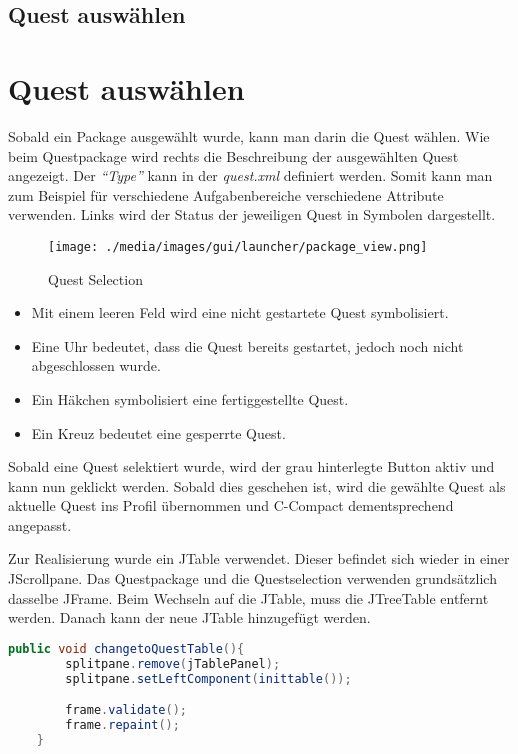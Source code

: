 \iffabian
	\subsection{Quest auswählen}
\else
	\section{Quest auswählen}
\fi

Sobald ein Package ausgewählt wurde, kann man darin die Quest wählen. Wie beim Questpackage wird rechts die Beschreibung der ausgewählten Quest angezeigt. Der \textit{"`Type"'} kann in der \textit{quest.xml} definiert werden. Somit kann man zum Beispiel für verschiedene Aufgabenbereiche verschiedene Attribute verwenden. Links wird der Status der jeweiligen Quest in Symbolen dargestellt.

\begin{figure}[h] 
  \centering
     \texttt{[image: ./media/images/gui/launcher/package\_view.png]}
  \caption{Quest Selection}
  \label{fig:Bild1}
\end{figure}

\begin{itemize}
\item Mit einem leeren Feld wird eine nicht gestartete Quest symbolisiert.
\item Eine Uhr bedeutet, dass die Quest bereits gestartet, jedoch noch nicht abgeschlossen wurde.
\item Ein Häkchen symbolisiert eine fertiggestellte Quest.
\item Ein Kreuz bedeutet eine gesperrte Quest. 
\end{itemize}

Sobald eine Quest selektiert wurde, wird der grau hinterlegte Button aktiv und kann nun geklickt werden. Sobald dies geschehen ist, wird die gewählte Quest als aktuelle Quest ins Profil übernommen und C-Compact dementsprechend angepasst.

Zur Realisierung wurde ein JTable verwendet. Dieser befindet sich wieder in einer JScrollpane. Das Questpackage und die Questselection verwenden grundsätzlich dasselbe JFrame. Beim Wechseln auf die JTable, muss die JTreeTable entfernt werden. Danach kann der neue JTable hinzugefügt werden.
\begin{lstlisting}[language=JAVA]
	public void changetoQuestTable(){
		splitpane.remove(jTablePanel);
		splitpane.setLeftComponent(inittable());

		frame.validate();
		frame.repaint();
	}
\end{lstlisting}

